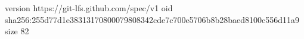 version https://git-lfs.github.com/spec/v1
oid sha256:255d77d1e38313170800079808342cde7c700e5706b8b28baed8100c556d11a9
size 82
